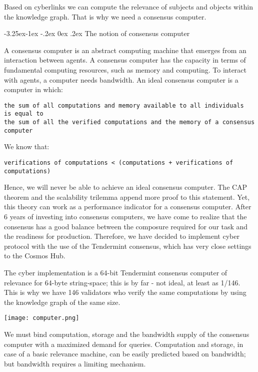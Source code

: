 \documentclass[8pt,oneside]{amsart}
\makeatletter
\newcommand{\linkgreen}[2]{\href{#1}{\color{green}{#2}}}
\renewcommand\subsection{\@startsection{subsection}{2}{\z@}%
                                     {-3.25ex\@plus -1ex \@minus -.2ex}%
                                     {0ex \@plus .2ex}%
                                     {\play\Large}}%
\newcommand{\titleSection}[1]{\subsection{#1}}
\newcommand{\code}[1]{{\PlayBold #1}}
\newenvironment{Figure}
  {\par\medskip\noindent\minipage{\linewidth}}
  {\endminipage\par\medskip}
\makeatother
\begin{document}
\begin{Abstract}
Based on \code{cyberlinks} we can compute the relevance of subjects and objects within the knowledge graph. That is why we need a consensus computer.

\titleSection{The notion of consensus computer}\label{The notion of consensus computer}

A consensus computer is an abstract computing machine that emerges from an interaction between agents. A consensus computer has the capacity in terms of fundamental computing resources, such as memory and computing. To interact with agents, a computer needs bandwidth. An ideal consensus computer is a computer in which:
\\
\begin{lstlisting}
the sum of all computations and memory available to all individuals
is equal to
the sum of all the verified computations and the memory of a consensus computer
\end{lstlisting}

We know that:

\begin{lstlisting}
verifications of computations < (computations + verifications of computations)
\end{lstlisting}

Hence, we will never be able to achieve an ideal consensus computer. The CAP theorem and the scalability trilemma append more proof to this statement. Yet, this theory can work as a performance indicator for a consensus computer. After 6 years of investing into consensus computers, we have come to realize that the \linkgreen{https://ipfs.io/ipfs/QmaMtD7xDgghqgjN62zWZ5TBGFiEjGQtuZBjJ9sMh816KJ}{Tendermint} consensus has a good balance between the composure required for our task and the readiness for production. Therefore, we have decided to implement  \code{cyber} protocol with the use of the Tendermint consensus, which has very close settings to the Cosmos Hub.

The \code{cyber} implementation is a 64-bit Tendermint consensus computer of relevance for 64-byte string-space; this is by far - not ideal, at least as 1/146. This is why we have 146 validators who verify the same computations by using the knowledge graph of the same size.

\begin{Figure}
  \centering
  \texttt{[image: computer.png]}
\end{Figure}

We must bind computation, storage and the bandwidth supply of the consensus computer with a maximized demand for queries. Computation and storage, in case of a basic relevance machine, can be easily predicted based on bandwidth; but bandwidth requires a limiting mechanism.


\end{Abstract}
\end{document}
